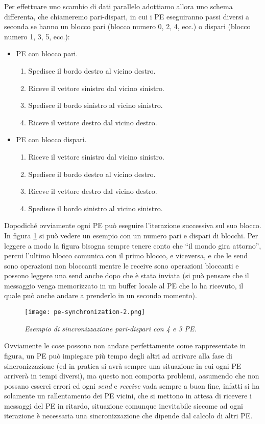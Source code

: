Per effettuare uno scambio di dati parallelo adottiamo allora uno schema differenta, che chiameremo pari-dispari, in cui i PE eseguiranno passi diversi a seconda se hanno un blocco pari (blocco numero 0, 2, 4, ecc.) o dispari (blocco numero 1, 3, 5, ecc.):
\begin{itemize}
  \item PE con blocco pari.
    \begin{enumerate}
      \item Spedisce il bordo destro al vicino destro.
      \item Riceve il vettore sinistro dal vicino sinistro.
      \item Spedisce il bordo sinistro al vicino sinistro.
      \item Riceve il vettore destro dal vicino destro.
    \end{enumerate}
  \item PE con blocco dispari.
    \begin{enumerate}
      \item Riceve il vettore sinistro dal vicino sinistro.
      \item Spedisce il bordo destro al vicino destro.
      \item Riceve il vettore destro dal vicino destro.
      \item Spedisce il bordo sinistro al vicino sinistro.
    \end{enumerate}
\end{itemize}
Dopodich\'e ovviamente ogni PE pu\`o eseguire l'iterazione successiva sul suo blocco. In figura \ref{fig:pe_synchronization_2} si pu\`o vedere un esempio con un numero pari e dispari di blocchi. Per leggere a modo la figura bisogna sempre tenere conto che ``il mondo gira attorno'', percui l'ultimo blocco comunica con il primo blocco, e viceversa, e che le send sono operazioni non bloccanti mentre le receive sono operazioni bloccanti e possono leggere una send anche dopo che \`e stata inviata (si pu\`o pensare che il messaggio venga memorizzato in un buffer locale al PE che lo ha ricevuto, il quale pu\`o anche andare a prenderlo in un secondo momento).
\begin{figure}[ht]
  \centering
  \texttt{[image: pe-synchronization-2.png]}
  \caption{\emph{Esempio di sincronizzazione pari-dispari con 4 e 3 PE.}}
  \label{fig:pe_synchronization_2}
\end{figure}
Ovviamente le cose possono non andare perfettamente come rappresentate in figura, un PE pu\`o impiegare pi\`u tempo degli altri ad arrivare alla fase di sincronizzazione (ed in pratica si avr\`a sempre una situazione in cui ogni PE arriver\`a in tempi diversi), ma questo non comporta problemi, assumendo che non possano esserci errori ed ogni \textit{send} e \textit{receive} vada sempre a buon fine, infatti si ha solamente un rallentamento dei PE vicini, che si mettono in attesa di ricevere i messaggi del PE in ritardo, situazione comunque inevitabile siccome ad ogni iterazione \`e necessaria una sincronizzazione che dipende dal calcolo di altri PE.

